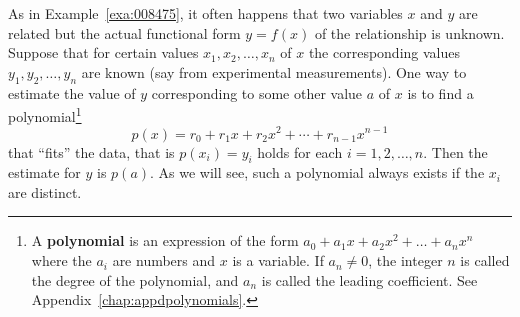 As in Example~\ref{exa:008475}, it often happens that two variables $x$ and $y$ are related but the actual functional form $y = f(x)$ of the relationship is unknown. Suppose that for certain values $x_{1}, x_{2}, \dots, x_{n}$ of $x$ the corresponding values $y_{1}, y_{2}, \dots, y_{n}$ are known (say from experimental measurements). One way to estimate the value of $y$ corresponding to some other value $a$ of $x$ is to find a polynomial\footnote{A \textbf{polynomial} is an expression of the form $a_{0} + a_{1}x + a_{2}x^{2} + \dots  + a_{n}x^{n}$ where the $a_{i}$ are numbers and $x$ is a variable. If $a_{n} \neq 0$, the integer $n$ is called the degree of the polynomial, and $a_{n}$ is called the leading coefficient. See Appendix~\ref{chap:appdpolynomials}.}
\begin{equation*}
p(x) = r_0 + r_1x + r_2x^2 + \cdots + r_{n-1}x^{n-1}
\end{equation*}
that ``fits'' the data, that is $p(x_{i}) = y_{i}$ holds for each $i = 1, 2, \dots , n$. Then the estimate for $y$ is $p(a)$. As we will see, such a polynomial always exists if the $x_{i}$ are distinct.


